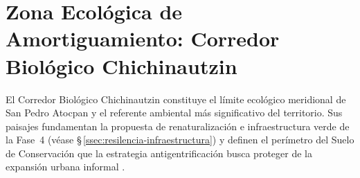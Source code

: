 \newpage
\section{Zona Ecológica de Amortiguamiento: Corredor Biológico Chichinautzin}
\label{anexo:ficha-chichinautzin}

El Corredor Biológico Chichinautzin constituye el límite ecológico meridional de San Pedro
Atocpan y el referente ambiental más significativo del territorio. Sus paisajes
fundamentan la propuesta de renaturalización e infraestructura verde de la Fase~4
(véase \S\,\ref{ssec:resilencia-infraestructura}) y definen el perímetro del Suelo de
Conservación que la estrategia antigentrificación busca proteger de la expansión urbana
informal \cite{balandrano2016conservacion}.

